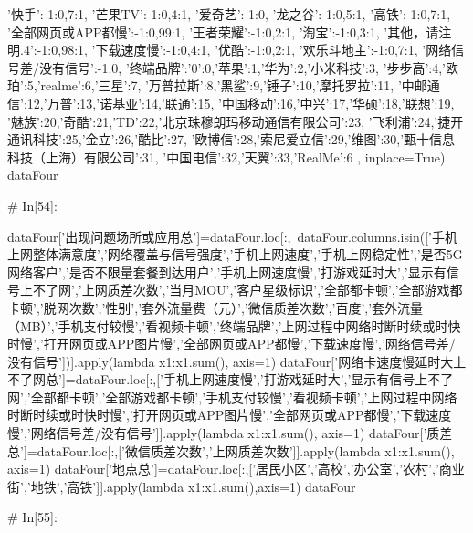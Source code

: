 \documentclass{MathorCupmodeling}
\begin{document}
\begin{python}
{                 '快手':{-1:0,7:1},
                 '芒果TV':{-1:0,4:1},
                 '爱奇艺':{-1:0},
                 '龙之谷':{-1:0,5:1},
                 '高铁':{-1:0,7:1},
                 '全部网页或APP都慢':{-1:0,99:1},
                 '王者荣耀':{-1:0,2:1},
                 '淘宝':{-1:0,3:1},
                 '其他，请注明.4':{-1:0,98:1},
                 '下载速度慢':{-1:0,4:1},
                 '优酷':{-1:0,2:1},
                 '欢乐斗地主':{-1:0,7:1},
                 '网络信号差/没有信号':{-1:0},
                 '终端品牌':{'0':0,'苹果':1,'华为':2,'小米科技':3,
                            '步步高':4,'欧珀':5,'realme':6,'三星':7,
                            '万普拉斯':8,'黑鲨':9,'锤子':10,'摩托罗拉':11,
                            '中邮通信':12,'万普':13,'诺基亚':14,'联通':15,
                            '中国移动':16,'中兴':17,'华硕':18,'联想':19,
                            '魅族':20,'奇酷':21,'TD':22,'北京珠穆朗玛移动通信有限公司':23,
                            '飞利浦':24,'捷开通讯科技':25,'金立':26,'酷比':27,
                            '欧博信':28,'索尼爱立信':29,'维图':30,'甄十信息科技（上海）有限公司':31,
                            '中国电信':32,'天翼':33,'RealMe':6}
                 }, inplace=True)
dataFour


# In[54]:


dataFour['出现问题场所或应用总']=dataFour.loc[:,~dataFour.columns.isin(['手机上网整体满意度','网络覆盖与信号强度','手机上网速度','手机上网稳定性','是否5G网络客户','是否不限量套餐到达用户','手机上网速度慢','打游戏延时大','显示有信号上不了网','上网质差次数','当月MOU','客户星级标识','全部都卡顿','全部游戏都卡顿','脱网次数','性别','套外流量费（元）','微信质差次数','百度','套外流量（MB）','手机支付较慢','看视频卡顿','终端品牌','上网过程中网络时断时续或时快时慢','打开网页或APP图片慢','全部网页或APP都慢','下载速度慢','网络信号差/没有信号'])].apply(lambda x1:x1.sum(), axis=1)
dataFour['网络卡速度慢延时大上不了网总']=dataFour.loc[:,['手机上网速度慢','打游戏延时大','显示有信号上不了网','全部都卡顿','全部游戏都卡顿','手机支付较慢','看视频卡顿','上网过程中网络时断时续或时快时慢','打开网页或APP图片慢','全部网页或APP都慢','下载速度慢','网络信号差/没有信号']].apply(lambda x1:x1.sum(), axis=1)
dataFour['质差总']=dataFour.loc[:,['微信质差次数','上网质差次数']].apply(lambda x1:x1.sum(), axis=1)
dataFour['地点总']=dataFour.loc[:,['居民小区','高校','办公室','农村','商业街','地铁','高铁']].apply(lambda x1:x1.sum(),axis=1)
dataFour


# In[55]:



\end{python}
\end{document}
